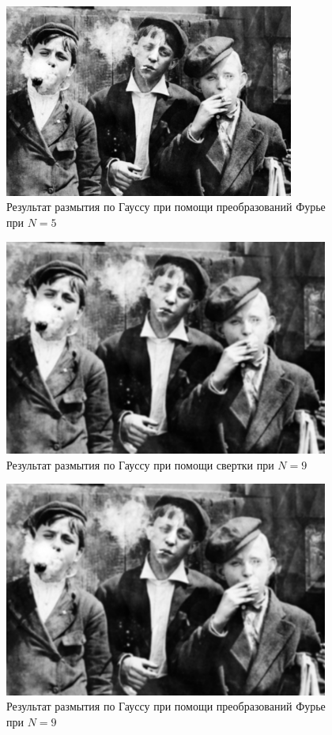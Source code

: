\begin{figure}[ht!]
    \centering
    \includegraphics[width=0.85\textwidth]{images/result/task_2/Gaussian_fourier_5.png}
    \caption{Результат размытия по Гауссу при помощи преобразований Фурье при $N=5$}
    \label{fig:ga_f_5}
\end{figure}

\begin{figure}[ht!]
    \centering
    \includegraphics[width=0.95\textwidth]{images/result/task_2/Gaussian_9.png}
    \caption{Результат размытия по Гауссу при помощи свертки при $N=9$}
    \label{fig:ga_c_9}
\end{figure}

\begin{figure}[ht!]
    \centering
    \includegraphics[width=0.95\textwidth]{images/result/task_2/Gaussian_fourier_9.png}
    \caption{Результат размытия по Гауссу при помощи преобразований Фурье при $N=9$}
    \label{fig:ga_f_9}
\end{figure}

